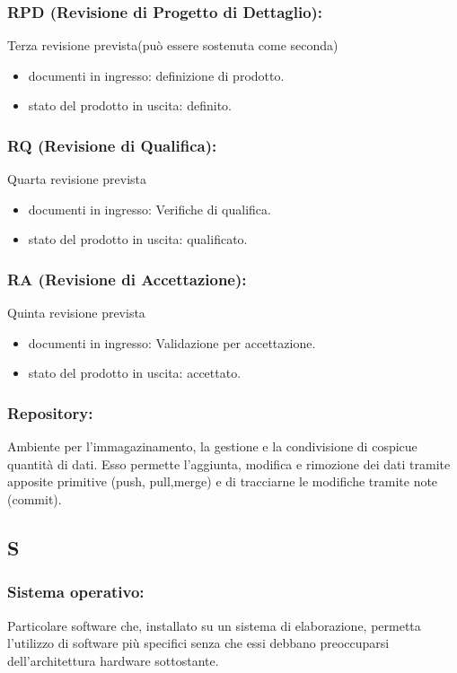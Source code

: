 \subsubsection*{RPD (Revisione di Progetto di Dettaglio):} Terza revisione
prevista(pu\`o essere sostenuta come seconda)
\begin{itemize}
\item documenti in ingresso: definizione di prodotto.
\item stato del prodotto in uscita: definito. 
\end{itemize}

\subsubsection*{RQ (Revisione di Qualifica):} Quarta revisione prevista
\begin{itemize}
\item documenti in ingresso: Verifiche di qualifica.
\item stato del prodotto in uscita: qualificato. 
\end{itemize}

\subsubsection*{RA (Revisione di Accettazione):} Quinta revisione prevista
\begin{itemize}
\item documenti in ingresso: Validazione per accettazione.
\item stato del prodotto in uscita: accettato. 
\end{itemize}

\subsubsection*{Repository:} Ambiente per l'immagazinamento, la gestione e la
condivisione di cospicue quantit\`a di dati. Esso permette l'aggiunta,
 modifica e rimozione dei dati tramite apposite primitive (push, pull,merge)
  e di tracciarne le modifiche tramite note (commit).
\subsection*{\huge{S}}
\subsubsection*{Sistema operativo:} Particolare software che, installato su un
sistema di elaborazione, permetta l'utilizzo di software pi\`u specifici senza che
essi debbano preoccuparsi dell'architettura hardware sottostante.

